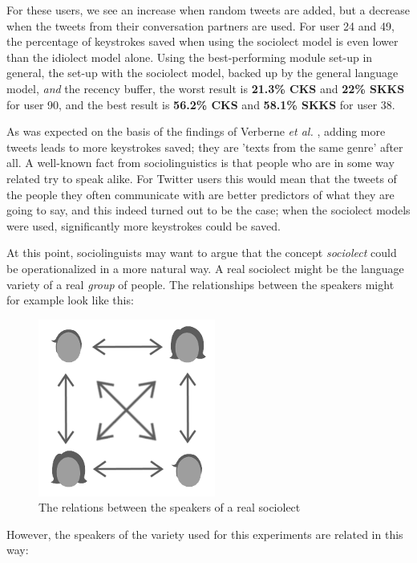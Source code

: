 \documentclass[11pt]{article}
\begin{document}
For these users, we see an increase when random tweets are added, but a decrease when the tweets from their conversation partners are used. For user 24 and 49, the percentage of keystrokes saved when using the sociolect model is even lower than the idiolect model alone.  Using the best-performing module set-up in general, the set-up with the sociolect model, backed up by the general language model, \emph{and} the recency buffer, the worst result is \textbf{21.3\% CKS} and \textbf{22\% SKKS} for user 90, and the best result is \textbf{56.2\% CKS} and \textbf{58.1\% SKKS} for user 38.

As was expected on the basis of the findings of Verberne {\em et al.} , adding more tweets leads to more keystrokes saved; they are 'texts from the same genre' after all. A well-known fact from sociolinguistics is that people who are in some way related try to speak alike. For Twitter users this would mean that the tweets of the people they often communicate with are better predictors of what they are going to say, and this indeed turned out to be the case; when the sociolect models were used, significantly more keystrokes could be saved.

At this point, sociolinguists may want to argue that the concept \emph{sociolect} could be operationalized in a more natural way. A real sociolect might be the language variety of a real \emph{group} of people. The relationships between the speakers might for example look like this:

\begin{figure}[H] \centering
\includegraphics[scale=0.75]{real_network}
\caption{The relations between the speakers of a real sociolect}
\end{figure} 

However, the speakers of the variety used for this experiments are related in this way:
\end{document}
